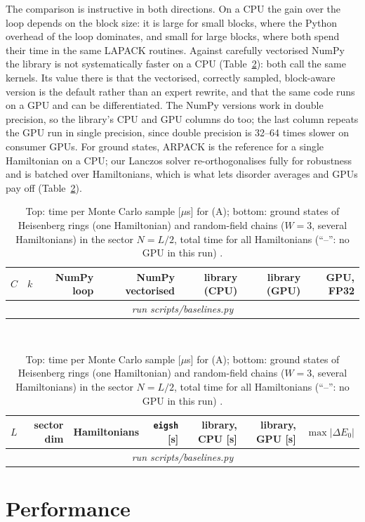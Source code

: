 \documentclass[11pt]{article}
\providecommand{\BaseMCRows}{\multicolumn{7}{c}{\emph{run scripts/baselines.py}}\\}
\providecommand{\BaseGSRows}{\multicolumn{7}{c}{\emph{run scripts/baselines.py}}\\}
\begin{document}
The comparison is instructive in both directions. On a CPU the gain over the loop depends on the block size: it is
large for small blocks, where the Python overhead of the loop dominates, and small for large blocks, where both spend
their time in the same LAPACK routines. Against carefully vectorised NumPy the library is not systematically faster on a
CPU (Table~\ref{tab:baselines}): both call the same kernels. Its value there is that the vectorised, correctly
sampled, block-aware version is the default rather than an expert rewrite, and that the same code runs on a GPU
and can be differentiated. The NumPy versions work in double precision, so the library's CPU and GPU columns do too;
the last column repeats the GPU run in single precision, since double precision is 32--64 times slower on consumer
GPUs. For ground states, ARPACK is the reference for a single Hamiltonian on a CPU; our Lanczos solver
re-orthogonalises fully for robustness and is batched over Hamiltonians, which is what lets disorder averages and GPUs
pay off (Table~\ref{tab:baselines}).

\begin{table}[h]
\centering\small
\begin{tabular}{rrrrrrr}
\toprule
$C$ & $k$ & NumPy loop & NumPy vectorised & library (CPU) & library (GPU) & GPU, FP32\\
\midrule
\BaseMCRows
\bottomrule
\end{tabular}\\[2mm]
\begin{tabular}{rrrrrrr}
\toprule
$L$ & sector dim & Hamiltonians & \texttt{eigsh} [s] & library, CPU [s] & library, GPU [s] & $\max|\Delta E_0|$\\
\midrule
\BaseGSRows
\bottomrule
\end{tabular}
\caption[]{Top: time per Monte Carlo sample [$\mu$s] for (A); bottom: ground states of Heisenberg rings
(one Hamiltonian) and random-field chains ($W=3$, several Hamiltonians) in the sector $N=L/2$, total time for all
Hamiltonians (``--'': no GPU in this run)
.}
\label{tab:baselines}
\end{table}

\section{Performance}\label{sec:performance}
\end{document}
